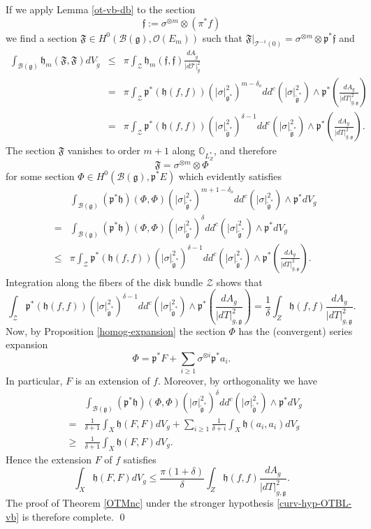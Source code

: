 \documentclass[12pt,hidelinks]{amsart}
\newcommand{\cO}{{\mathcal O}}
\newcommand{\cZ}{{\mathcal Z}}
\newcommand{\sB}{{\mathscr B}}
\newcommand{\sT}{{\mathscr T}}
\newcommand{\fF}{{\mathfrak F}}
\newcommand{\ff}{{\mathfrak f}}
\newcommand{\fg}{{\mathfrak g}}
\newcommand{\fh}{{\mathfrak h}}
\newcommand{\fp}{{\mathfrak p}}
\newcommand{\bbO}{{\mathbb O}}
\newcommand{\tensor}{\otimes}
\begin{document}
If we apply Lemma \ref{ot-vb-db} to the section 
\[
\ff := \sigma ^{\tensor m} \tensor (\pi ^* f)
\]
we find a section $\fF \in H^0(\sB(\fg), \cO (E_m))$ such that $\fF |_{\sT ^{-1}(0)} = \sigma ^{\tensor m} \tensor \fp ^* \ff$ and
\begin{eqnarray*}
\int _{\sB(\fg)} \fh _m (\fF, \fF) dV_{\tilde g} &\le& \pi \int _{\cZ} \fh _m (\ff, \ff) \frac{dA_{\tilde g}}{|d\sT|^2_{\tilde g}}\\
&=& \pi \int _{\cZ} \fp ^* (\fh (f,f))( |\sigma |^2_{\fg ^*})^{m-\delta _o} dd^c( |\sigma|^2_{\tilde \fg^*}) \wedge \fp ^* \left (\frac{dA_g}{|dT|^2_{g, \fg}}\right )\\
 &=& \pi \int _{\cZ} \fp ^* (\fh (f,f))( |\sigma |^2 _{\tilde \fg^*})^{\delta -1} dd^c( |\sigma|^2_{\tilde \fg^*}) \wedge \fp ^* \left (\frac{dA_g}{|dT|^2_{g,\fg}}\right ).
\end{eqnarray*}
The section $\fF$ vanishes to order $m+1$ along $\bbO _{L_Z^*}$, and therefore 
\[
\fF = \sigma ^{\tensor m} \tensor \Phi
\]
for some section $\Phi \in H^0(\sB (\fg), \fp ^* E)$ which evidently satisfies 
\begin{eqnarray*}
&& \int _{\sB (\fg)} (\fp ^*\fh) (\Phi , \Phi)( |\sigma |^2_{\tilde \fg^*})^{m+1-\delta _o} dd^c( |\sigma|^2_{\tilde \fg^*}) \wedge \fp ^* dV_g  \\
&=& \int _{\sB (\fg)} (\fp ^*\fh) (\Phi , \Phi)( |\sigma |^2_{\tilde \fg^*})^{\delta} dd^c( |\sigma|^2_{\tilde \fg^*}) \wedge \fp ^* dV_g \\ &\le & \pi \int _{\cZ} \fp ^* (\fh (f,f))( |\sigma |^2_{\tilde \fg^*})^{\delta -1} dd^c( |\sigma|^2_{\tilde \fg^*}) \wedge \fp ^* \left (\frac{dA_g}{|dT|^2_{g,\fg}}\right ).
\end{eqnarray*}
Integration along the fibers of the disk bundle $\cZ$ shows that 
\[
\int _{\cZ} \fp ^* (\fh (f,f))( |\sigma |^2_{\tilde \fg^*})^{\delta -1} dd^c( |\sigma|^2_{\tilde \fg^*}) \wedge \fp ^* \left (\frac{dA_g}{|dT|^2_{g,\fg}}\right ) = \frac{1}{\delta} \int _Z \fh (f,f) \frac{dA_g}{|dT|^2_{g,\fg}}.
\]
Now, by Proposition \ref{homog-expansion} the section $\Phi$ has the (convergent) series expansion 
\[
\Phi = \fp ^* F  + \sum _{i \ge 1} \sigma ^{\tensor i} \fp ^* a_i.
\]
In particular, $F$ is an extension of $f$.  Moreover, by orthogonality we have
\begin{eqnarray*}
&& \int _{\sB (\fg)} (\fp ^*\fh) (\Phi , \Phi)( |\sigma |^2_{\tilde \fg^*})^{\delta} dd^c( |\sigma|^2_{\tilde \fg^*}) \wedge \fp ^* dV_g \\
&=& \frac{1}{\delta +1} \int _{X} \fh (F,F)  dV_g  + \sum _{i\ge 1}\frac{1}{\delta +i} \int _{X} \fh (a_i,a_i)  dV_g\\
&\ge &\frac{1}{\delta +1} \int _{X} \fh (F,F)  dV_g.
\end{eqnarray*}
Hence the extension $F$ of $f$ satisfies 
\[
\int _X \fh (F,F) dV_g \le \frac{\pi (1+\delta)}{\delta} \int _Z \fh (f,f) \frac{dA_g}{|dT|^2_{g,\fg}}.
\]
The proof of Theorem \ref{OTMnc} under the stronger hypothesis \eqref{curv-hyp-OTBL-vb} is therefore complete.
\qed
\end{document}
